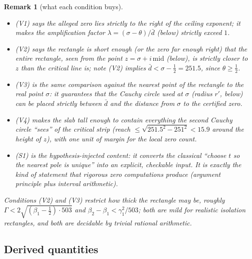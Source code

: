 \documentclass[11pt]{amsart}
\newtheorem{remark}[theorem]{Remark}
\numberwithin{equation}{section}
\newcommand{\Sig}{\sigma}
\newcommand{\dbar}{\bar{d}}
\begin{document}
\begin{remark}[what each condition buys]\label{rem:conditions}\
\begin{itemize}
\item (V1) says the alleged zero lies strictly to the right of the
ceiling exponent; it makes the amplification factor
$\lambda = (\Sig-\theta)/\dbar$ (below) strictly exceed $1$.
\item (V2) says the rectangle is short enough (or the zero far enough
right) that the \emph{entire rectangle}, seen from the point
$z = \Sig + i\,\mathrm{mid}$ (below), is strictly closer to $z$ than the
critical line is; note (V2) implies
$\dbar < \Sig - \tfrac12 = 251.5$, since $\theta \ge \tfrac12$.
\item (V3) is the same comparison against the \emph{nearest point of the
rectangle to the real point} $\Sig$: it guarantees that the Cauchy
circle used at $\Sig$ (radius $r'$, below) can be placed strictly between
$\dbar$ and the distance from $\Sig$ to the certified zero.
\item (V4) makes the slab tall enough to contain everything the second
Cauchy circle ``sees'' of the critical strip (reach $\le \sqrt{251.5^2
- 251^2} < 15.9$ around the height of $z$), with one unit of margin for
the local zero count.
\item (S1) is the hypothesis-injected content: it converts the classical
``choose $t$ so the nearest pole is unique'' into an explicit, checkable
input. It is exactly the kind of statement that rigorous zero
computations produce (argument principle plus interval arithmetic).
\end{itemize}
Conditions (V2) and (V3) restrict how thick the rectangle may be,
roughly $\Gamma < 2\sqrt{(\beta_1 - \tfrac12)\cdot 503}$ and
$\beta_2 - \beta_1 < \gamma_1^2/503$; both are mild for realistic
isolation rectangles, and both are decidable by trivial rational
arithmetic.
\end{remark}

\subsection{Derived quantities}\label{sec:derived}
\end{document}
